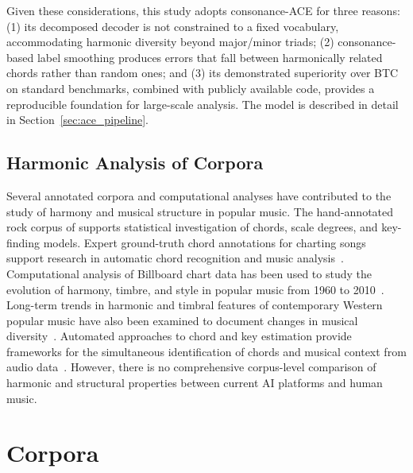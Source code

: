 \documentclass{article}
\newcommand{\rev}[1]{{\color{r2}#1}} %
\begin{document}
Given these considerations, this study adopts consonance-ACE \citep{poltronieri2025discord} for three reasons: (1) its decomposed decoder is not constrained to a fixed vocabulary, accommodating harmonic diversity beyond major/minor triads; (2) consonance-based label smoothing produces errors that fall between harmonically related chords rather than random ones; and (3) its demonstrated superiority over BTC on standard benchmarks, combined with publicly available code, provides a reproducible foundation for large-scale analysis. The model is described in detail in Section~\ref{sec:ace_pipeline}.

\subsection{Harmonic Analysis of Corpora}
Several annotated corpora and computational analyses have contributed to the study of harmony and musical structure in popular music. \rev{The hand-annotated rock corpus of \citet{temperley2013statistical} supports statistical investigation of chords, scale degrees, and key-finding models.} Expert ground-truth chord annotations for charting songs support research in automatic chord recognition and music analysis~\citep{burgoyne2011expert}. Computational analysis of Billboard chart data has been used to study the evolution of harmony, timbre, and style in popular music from 1960 to 2010~\citep{mauch2015evolution}. Long-term trends in harmonic and timbral features of contemporary Western popular music have also been examined to document changes in musical diversity~\citep{serra2012measuring}. Automated approaches to chord and key estimation provide frameworks for the simultaneous identification of chords and musical context from audio data~\citep{mauch2009simultaneous}. However, there is no comprehensive corpus-level comparison of harmonic and structural properties between current AI platforms and human music.

\section{Corpora}
\label{sec:corpora}
\end{document}
